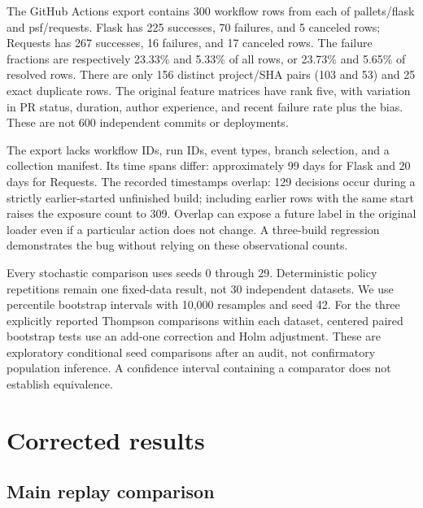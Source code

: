 \documentclass[
  10pt,
]{article}
\begin{document}
The GitHub Actions export contains 300 workflow rows from each of
pallets/flask and psf/requests. Flask has 225 successes, 70 failures,
and 5 canceled rows; Requests has 267 successes, 16 failures, and 17
canceled rows. The failure fractions are respectively 23.33\% and 5.33\%
of all rows, or 23.73\% and 5.65\% of resolved rows. There are only 156
distinct project/SHA pairs (103 and 53) and 25 exact duplicate rows. The
original feature matrices have rank five, with variation in PR status,
duration, author experience, and recent failure rate plus the bias.
These are not 600 independent commits or deployments.

The export lacks workflow IDs, run IDs, event types, branch selection,
and a collection manifest. Its time spans differ: approximately 99 days
for Flask and 20 days for Requests. The recorded timestamps overlap: 129
decisions occur during a strictly earlier-started unfinished build;
including earlier rows with the same start raises the exposure count to
309. Overlap can expose a future label in the original loader even if a
particular action does not change. A three-build regression demonstrates
the bug without relying on these observational counts.

Every stochastic comparison uses seeds 0 through 29. Deterministic
policy repetitions remain one fixed-data result, not 30 independent
datasets. We use percentile bootstrap intervals with 10,000 resamples
and seed 42. For the three explicitly reported Thompson comparisons
within each dataset, centered paired bootstrap tests use an add-one
correction and Holm adjustment. These are exploratory conditional seed
comparisons after an audit, not confirmatory population inference. A
confidence interval containing a comparator does not establish
equivalence.

\section{Corrected results}\label{corrected-results}

\subsection{Main replay comparison}\label{main-replay-comparison}
\end{document}
